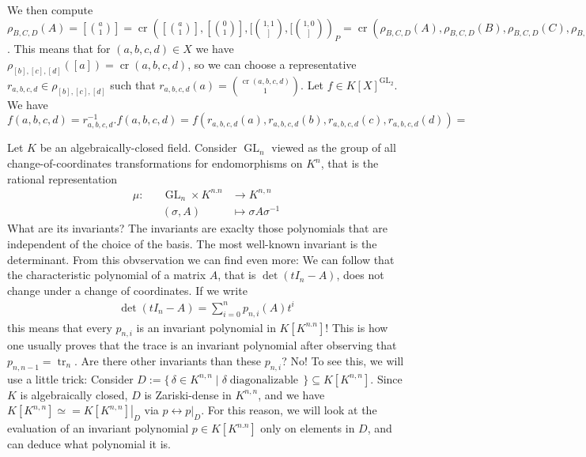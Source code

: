\begin{example}
  We then compute $\rho_{B,C,D} (A) = [\binom{a}{1}] = \operatorname{cr}([\binom{a}{1}],[\binom{0}{1}],[\binom{1,1}],[\binom{1,0}])_P = \operatorname{cr}(\rho_{B,C,D}(A),\rho_{B,C,D}(B),\rho_{B,C,D}(C),\rho_{B,C,D}(D))_P = \operatorname{cr}(A,B,C,D)_P$.
  This means that for $(a,b,c,d) \in X$ we have $\rho_{[b],[c],[d]} ([a]) = \operatorname{cr}(a,b,c,d)$, so we can choose a representative $r_{a,b,c,d} \in \rho_{[b],[c],[d]}$ such that $r_{a,b,c,d}(a) = \binom{\operatorname{cr}(a,b,c,d)}{1}$.
  Let $f \in K[X]^{\operatorname{GL}_2}$.
  We have $f(a,b,c,d) = r_{a,b,c,d}^{-1}.f (a,b,c,d) = f(r_{a,b,c,d}(a),r_{a,b,c,d}(b),r_{a,b,c,d}(c),r_{a,b,c,d}(d)) = $
\end{example}

\begin{example}
  Let $K$ be an algebraically-closed field.
  Consider $\operatorname{GL}_n$ viewed as the group of all change-of-coordinates transformations for endomorphisms on $K^n$, that is the rational representation
  \begin{equation}
    \begin{aligned}
      \mu \colon && \operatorname{GL}_n \times K^{n.n} & \longrightarrow K^{n,n} \\
      && (\sigma,A) &\longmapsto \sigma A \sigma^{-1}
    \end{aligned}
  \end{equation}
  What are its invariants?
  The invariants are exaclty those polynomials that are independent of the choice of the basis.
  The most well-known invariant is the determinant.
  From this obvservation we can find even more:
  We can follow that the characteristic polynomial of a matrix $A$, that is $\operatorname{det} (tI_n - A)$, does not change under a change of coordinates.
  If we write
  \begin{equation}
    \begin{aligned}
      \operatorname{det} (tI_n - A) = \sum_{i=0}^n p_{n,i} (A) t^i
    \end{aligned}
  \end{equation}
  this means that every $p_{n,i}$ is an invariant polynomial in $K[K^{n.n}]$!
  This is how one usually proves that the trace is an invariant polynomial after observing that $p_{n,n-1} = \operatorname{tr}_n$.
  Are there other invariants than these $p_{n,i}$?
  No!
  To see this, we will use a little trick:
  Consider $D := \{\, \delta \in K^{n,n} \mid \delta \operatorname{diagonalizable} \,\} \subseteq K[K^{n,n}]$.
  Since $K$ is algebraically closed, $D$ is Zariski-dense in $K^{n,n}$, and we have $K[K^{n,n}] \simeq = \left. K[K^{n,n}] \right|_{D}$ via $p \leftrightarrow \left. p \right|_{D}$.
  For this reason, we will look at the evaluation of an invariant polynomial $p \in K[K^{n.n}] $ only on elements in $D$, and can deduce what polynomial it is.


\end{example}
